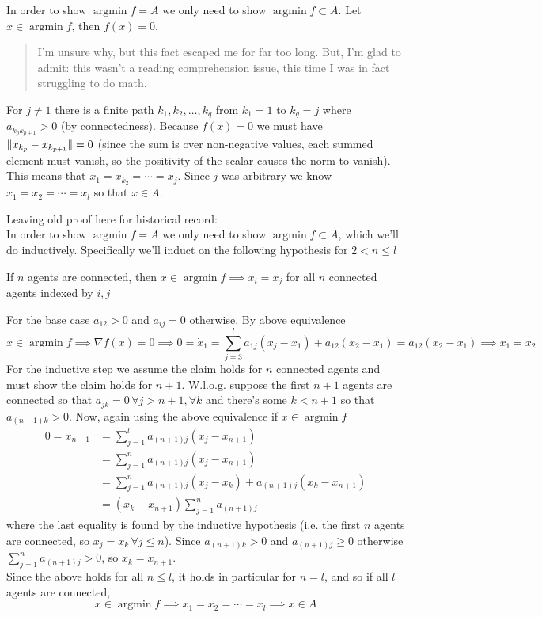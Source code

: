 \documentclass{article}
\newenvironment{ex}[1]
  {\renewcommand\theexercise{#1}\exercise}
  {\endexercise}
\DeclareMathOperator*{\argmin}{arg min}
\begin{document}
\begin{ex}{8.20}
  In order to show $\argmin f = A$ we only need to show $\argmin f \subset A$. Let $x \in \argmin f$, then $f(x) = 0$.
  \begin{quote}
    I'm unsure why, but this fact escaped me for far too long. But, I'm glad to admit: this wasn't a reading comprehension issue, this time I was in fact struggling to do math.
  \end{quote}
  For $j \ne 1$ there is a finite path $k_1, k_2, \ldots, k_q$ from $k_1=1$ to $k_q=j$ where $a_{k_p k_{p+1}} > 0$ (by connectedness). Because $f(x) = 0$ we must have $\lVert x_{k_p} - x_{k_{p+1}}\rVert = 0$ (since the sum is over non-negative values, each summed element must vanish, so the positivity of the scalar causes the norm to vanish). This means that $x_1 = x_{k_2} = \cdots = x_j$. Since $j$ was arbitrary we know $x_1 = x_2 = \cdots = x_l$ so that $x \in A$.

  \pagehline

  Leaving old proof here for historical record:
  \, \\

  In order to show $\argmin f = A$ we only need to show $\argmin f \subset A$, which we'll do inductively. Specifically we'll induct on the following hypothesis for $2 < n \le l$ \, \\


  \begin{claim}
    If $n$ agents are connected, then $x \in \argmin f \implies x_i = x_j$ for all $n$ connected agents indexed by $i,j$
  \end{claim}


  For the base case $a_{12} > 0$ and $a_{ij} = 0$ otherwise. By above equivalence
  $$
  x \in \argmin f \implies \nabla f(x) = 0 \implies 0 = \dot{x}_1 = \sum_{j=3}^l a_{1j} (x_j - x_1) + a_{12}( x_2 - x_1 ) = a_{12} ( x_2 - x_1 ) \implies x_1 = x_2
  $$
  For the inductive step we assume the claim holds for $n$ connected agents and must show the claim holds for $n+1$. W.l.o.g. suppose the first $n+1$ agents are connected so that $a_{jk} = 0 \, \forall j > n+1, \forall k$ and there's some $k < n+1$ so that $a_{(n+1)k} > 0$. Now, again using the above equivalence if $x \in \argmin f$
  \begin{align*}
    0 = \dot{x}_{n+1} &= \sum_{j=1}^l a_{(n+1)j} (x_j - x_{n+1}) \\
    &= \sum_{j=1}^n a_{(n+1)j} (x_j - x_{n+1}) \\
    &= \sum_{j=1}^n a_{(n+1)j} (x_j - x_k) + a_{(n+1)j} (x_k - x_{n+1}) \\
    &= (x_k - x_{n+1}) \sum_{j=1}^n a_{(n+1)j}
  \end{align*}
  where the last equality is found by the inductive hypothesis (i.e. the first $n$ agents are connected, so $x_j = x_k \, \forall j \le n$). Since $a_{(n+1)k} > 0$ and $a_{(n+1)j} \ge 0$ otherwise $\sum_{j=1}^n a_{(n+1)j} > 0$, so $x_k = x_{n+1}$. \, \\

  Since the above holds for all $n \le l$, it holds in particular for $n = l$, and so if all $l$ agents are connected,
  $$
  x \in \argmin f \implies x_1 = x_2 = \cdots = x_l \implies x \in A
  $$
\end{ex} %
\end{document}
